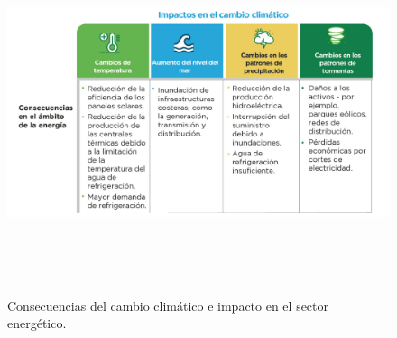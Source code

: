 \documentclass{article}
\begin{document}
\begin{figure}
\centering
\includegraphics[width=7.29167in,height=4.16667in]{Imagen 3.png}
\caption{Consecuencias del cambio climático e impacto en el sector
energético.}
\end{figure}



\end{document}
